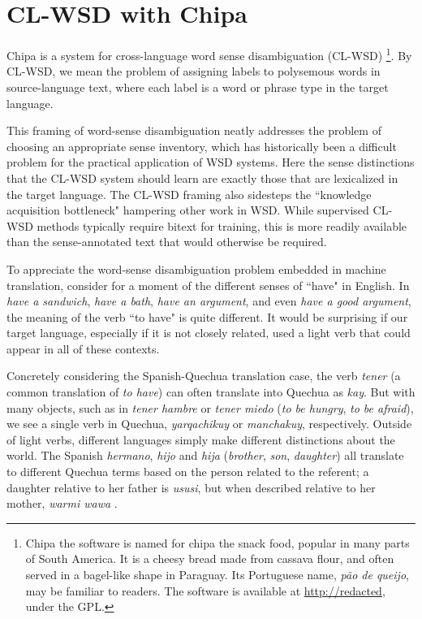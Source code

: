 \documentclass[10pt, a4paper]{article}
\begin{document}
\section{CL-WSD with Chipa}
Chipa is a system for cross-language word sense disambiguation (CL-WSD)
\footnote{Chipa the software is named for chipa the snack food, popular in many
parts of South America. It is a cheesy bread made from cassava flour, and
often served in a bagel-like shape in Paraguay. Its Portuguese name,
\emph{p\~{a}o de queijo}, may be familiar to readers. The software is available
at \url{http://redacted}, under the GPL.}. By
CL-WSD, we mean the problem of assigning labels to polysemous words in
source-language text, where each label is a word or phrase type in the target
language.

This framing of word-sense disambiguation neatly addresses the problem of
choosing an appropriate sense inventory, which has historically been a
difficult problem for the practical application of WSD systems.
Here the sense distinctions that the CL-WSD system should learn are exactly
those that are lexicalized in the target language.
The CL-WSD framing also sidesteps the ``knowledge
acquisition bottleneck" \cite{agirre2006word}
hampering other work in WSD. While supervised CL-WSD methods typically require
bitext for training, this is more readily available than the sense-annotated
text that would otherwise be required.

To appreciate the word-sense disambiguation problem embedded in machine
translation, consider for a moment of the different senses of ``have" in
English. In \emph{have a sandwich}, \emph{have a bath}, \emph{have an
argument}, and even \emph{have a good argument}, the meaning of the verb ``to
have" is quite different. It would be surprising if our target language,
especially if it is not closely related, used a light verb that could appear in
all of these contexts.

Concretely considering the Spanish-Quechua translation case, the verb
\emph{tener} (a common translation of \emph{to have}) can often translate into
Quechua as \emph{kay}. But with many objects, such as in \emph{tener hambre} or
\emph{tener miedo} (\emph{to be hungry}, \emph{to be afraid}), we see a single
verb in Quechua, \emph{yarqachikuy} or \emph{manchakuy}, respectively.  Outside
of light verbs, different languages simply make different distinctions about
the world. The Spanish \emph{hermano}, \emph{hijo} and \emph{hija}
(\emph{brother}, \emph{son}, \emph{daughter}) all translate to different
Quechua terms based on the person related to the referent; a daughter relative to
her father is \emph{ususi}, but when described relative to her mother,
\emph{warmi wawa} \cite{academiamayor}.
\end{document}
